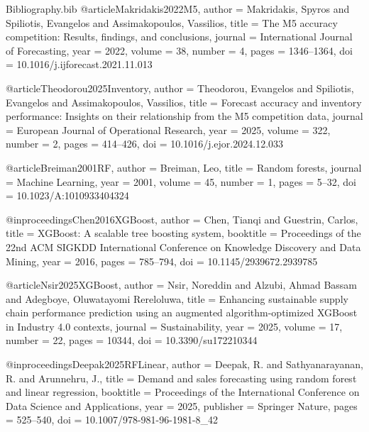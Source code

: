 \begin{filecontents*}{Bibliography.bib}
@article{Makridakis2022M5,
  author  = {Makridakis, Spyros and Spiliotis, Evangelos and Assimakopoulos, Vassilios},
  title   = {The M5 accuracy competition: Results, findings, and conclusions},
  journal = {International Journal of Forecasting},
  year    = {2022},
  volume  = {38},
  number  = {4},
  pages   = {1346--1364},
  doi     = {10.1016/j.ijforecast.2021.11.013}
}

@article{Theodorou2025Inventory,
  author  = {Theodorou, Evangelos and Spiliotis, Evangelos and Assimakopoulos, Vassilios},
  title   = {Forecast accuracy and inventory performance: Insights on their relationship from the M5 competition data},
  journal = {European Journal of Operational Research},
  year    = {2025},
  volume  = {322},
  number  = {2},
  pages   = {414--426},
  doi     = {10.1016/j.ejor.2024.12.033}
}

@article{Breiman2001RF,
  author  = {Breiman, Leo},
  title   = {Random forests},
  journal = {Machine Learning},
  year    = {2001},
  volume  = {45},
  number  = {1},
  pages   = {5--32},
  doi     = {10.1023/A:1010933404324}
}

@inproceedings{Chen2016XGBoost,
  author    = {Chen, Tianqi and Guestrin, Carlos},
  title     = {XGBoost: A scalable tree boosting system},
  booktitle = {Proceedings of the 22nd ACM SIGKDD International Conference on Knowledge Discovery and Data Mining},
  year      = {2016},
  pages     = {785--794},
  doi       = {10.1145/2939672.2939785}
}

@article{Nsir2025XGBoost,
  author  = {Nsir, Noreddin and Alzubi, Ahmad Bassam and Adegboye, Oluwatayomi Rereloluwa},
  title   = {Enhancing sustainable supply chain performance prediction using an augmented algorithm-optimized XGBoost in Industry 4.0 contexts},
  journal = {Sustainability},
  year    = {2025},
  volume  = {17},
  number  = {22},
  pages   = {10344},
  doi     = {10.3390/su172210344}
}

@inproceedings{Deepak2025RFLinear,
  author    = {Deepak, R. and Sathyanarayanan, R. and Arunnehru, J.},
  title     = {Demand and sales forecasting using random forest and linear regression},
  booktitle = {Proceedings of the International Conference on Data Science and Applications},
  year      = {2025},
  publisher = {Springer Nature},
  pages     = {525--540},
  doi       = {10.1007/978-981-96-1981-8\_42}
}


\end{filecontents*}
